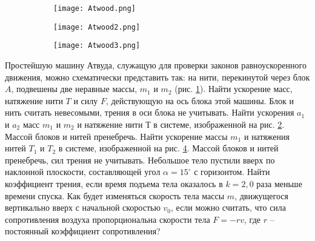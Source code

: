 \begin{figure}[h]
\centering
\begin{subfigure}{.3\textwidth}
  \centering
  \texttt{[image: Atwood.png]}
  \caption{}
  \label{Atwood}
\end{subfigure}%
\begin{subfigure}{.3\textwidth}
  \centering
  \texttt{[image: Atwood2.png]}
  \caption{}
  \label{Atwood2}
\end{subfigure}
\begin{subfigure}{.3\textwidth}
  \centering
  \texttt{[image: Atwood3.png]}
  \caption{}
  \label{Atwood3}
\end{subfigure}
\caption{}
\end{figure}
\AddProb Простейшую машину Атвуда, служащую для проверки законов равноускоренного движения, можно схематически представить так: на нити, перекинутой через блок $A$, подвешены две неравные массы, $m_1$
и $m_2$ (рис. \ref{Atwood}). Найти ускорение масс, натяжение нити $T$ и силу $F$, действующую на ось блока этой машины. Блок и нить считать невесомыми, трения в оси блока не учитывать.
\AddProb Найти ускорения $a_1$ и $a_2$ масс $m_1$ и $m_2$ и натяжение нити $Т$ в системе, изображенной на рис. \ref{Atwood2}. Массой блоков и нитей пренебречь.
\AddProb Найти ускорение массы $m_1$ и натяжения нитей $T_1$ и $T_2$ в системе, изображенной на рис. \ref{Atwood3}. Массой блоков и нитей пренебречь, сил трения не учитывать.
\AddProb Небольшое тело пустили вверх по наклонной плоскости, составляющей угол $\alpha  = 15^{\circ}$ с горизонтом. Найти коэффициент трения, если время подъема тела оказалось в $k = 2,0$ раза меньше времени спуска.
\AddProb Как будет изменяться скорость тела массы $m$, движущегося вертикально вверх с начальной скоростью $v_0$, если можно считать, что сила сопротивления воздуха пропорциональна скорости тела $F = -rv$, где $r$ -- постоянный коэффициент сопротивления?

\clearpage
